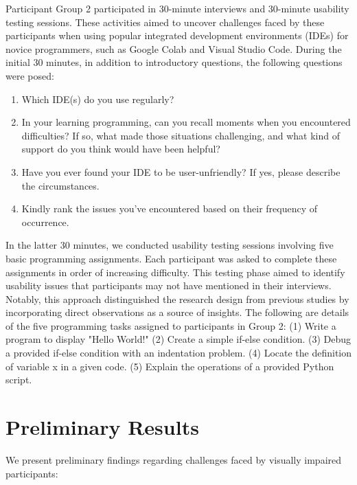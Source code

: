 Participant Group 2 participated in 30-minute interviews and 30-minute
usability testing sessions. These activities aimed to uncover
challenges faced by these participants when using popular integrated
development environments (IDEs) for novice programmers, such as Google
Colab and Visual Studio Code. During the initial 30 minutes, in
addition to introductory questions, the following questions were posed:

\begin{enumerate}

\item Which IDE(s) do you use regularly?
  
\item In your learning programming, can you recall moments when you encountered difficulties? If so, what made those situations challenging, and what kind of support do you think would have been helpful?

\item Have you ever found your IDE to be user-unfriendly? If yes, please describe the circumstances.

\item Kindly rank the issues you've encountered based on their frequency of occurrence.

\end{enumerate}

In the latter 30 minutes, we conducted usability testing sessions
involving five basic programming assignments. Each participant was
asked to complete these assignments in order of increasing
difficulty. This testing phase aimed to identify usability issues that
participants may not have mentioned in their interviews. Notably, this
approach distinguished the research design from previous studies by
incorporating direct observations as a source of insights. The
following are details of the five programming tasks assigned to
participants in Group 2: (1) Write a program to display "Hello World!"
(2) Create a simple if-else condition.  (3) Debug a provided if-else
condition with an indentation problem.  (4) Locate the definition of
variable x in a given code.  (5) Explain the operations of a provided
Python script.

\section{Preliminary Results}

We present preliminary findings regarding challenges faced by visually impaired participants:

